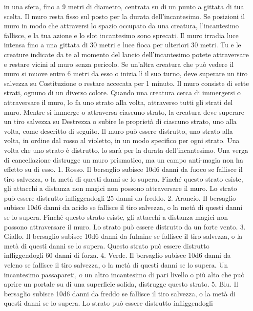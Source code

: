\begin{multicols}{2}
in una sfera, fino a 9 metri di diametro, centrata su di un
punto a gittata di tua scelta. Il muro resta fisso sul posto
per la durata dell’incantesimo. Se posizioni il muro in
modo che attraversi lo spazio occupato da una
creatura, l’incantesimo fallisce, e la tua azione e lo slot
incantesimo sono sprecati.
Il muro irradia luce intensa fino a una gittata di 30 metri
e luce fioca per ulteriori 30 metri. Tu e le creature
indicate da te al momento del lancio dell’incantesimo
potete attraversare e restare vicini al muro senza
pericolo. Se un’altra creatura che può vedere il muro si
muove entro 6 metri da esso o inizia lì il suo turno, deve
superare un tiro salvezza su Costituzione o restare
accecata per 1 minuto.
Il muro consiste di sette strati, ognuno di un diverso
colore. Quando una creatura cerca di immergersi o
attraversare il muro, lo fa uno strato alla volta,
attraverso tutti gli strati del muro. Mentre si immerge o
attraversa ciascuno strato, la creatura deve superare un
tiro salvezza su Destrezza o subire le proprietà di
ciascuno strato, uno alla volta, come descritto di
seguito.
Il muro può essere distrutto, uno strato alla volta, in
ordine dal rosso al violetto, in un modo specifico per
ogni strato. Una volta che uno strato è distrutto, lo sarà
per la durata dell’incantesimo. Una verga di
cancellazione distrugge un muro prismatico, ma un
campo anti-magia non ha effetto su di esso.
1. Rosso. Il bersaglio subisce 10d6 danni da fuoco se
fallisce il tiro salvezza, o la metà di questi danni se lo
supera. Finché questo strato esiste, gli attacchi a
distanza non magici non possono attraversare il muro. 
Lo strato può essere distrutto infliggendogli 25 danni da
freddo.
2. Arancio. Il bersaglio subisce 10d6 danni da acido se
fallisce il tiro salvezza, o la metà di questi danni se lo
supera. Finché questo strato esiste, gli attacchi a
distanza magici non possono attraversare il muro. Lo
strato può essere distrutto da un forte vento.
3. Giallo. Il bersaglio subisce 10d6 danni da fulmine se
fallisce il tiro salvezza, o la metà di questi danni se lo
supera. Questo strato può essere distrutto infliggendogli
60 danni di forza.
4. Verde. Il bersaglio subisce 10d6 danni da veleno se
fallisce il tiro salvezza, o la metà di questi danni se lo
supera. Un incantesimo passapareti, o un altro
incantesimo di pari livello o più alto che può aprire un
portale su di una superficie solida, distrugge questo
strato.
5. Blu. Il bersaglio subisce 10d6 danni da freddo se
fallisce il tiro salvezza, o la metà di questi danni se lo
supera. Lo strato può essere distrutto infliggendogli

\end{multicols}
